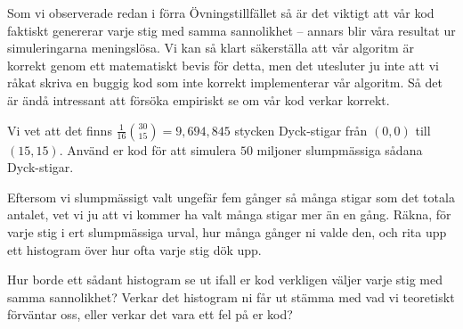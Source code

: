 \documentclass[nobib]{tufte-handout}
\begin{document}
Som vi observerade redan i förra Övningstillfället så är det viktigt att vår kod faktiskt genererar varje stig med samma sannolikhet -- annars blir våra resultat ur simuleringarna meningslösa. Vi kan så klart säkerställa att vår algoritm är korrekt genom ett matematiskt bevis för detta, men det utesluter ju inte att vi råkat skriva en buggig kod som inte korrekt implementerar vår algoritm. Så det är ändå intressant att försöka empiriskt se om vår kod verkar korrekt.

\begin{xca}
    Vi vet att det finns $\frac{1}{16}\binom{30}{15} = 9,694,845$ stycken Dyck-stigar från $(0,0)$ till $(15,15)$. Använd er kod för att simulera $50$ miljoner slumpmässiga sådana Dyck-stigar.

    Eftersom vi slumpmässigt valt ungefär fem gånger så många stigar som det totala antalet, vet vi ju att vi kommer ha valt många stigar mer än en gång. Räkna, för varje stig i ert slumpmässiga urval, hur många gånger ni valde den, och rita upp ett histogram över hur ofta varje stig dök upp.

    Hur borde ett sådant histogram se ut ifall er kod verkligen väljer varje stig med samma sannolikhet? Verkar det histogram ni får ut stämma med vad vi teoretiskt förväntar oss, eller verkar det vara ett fel på er kod?
\end{xca}
\end{document}
